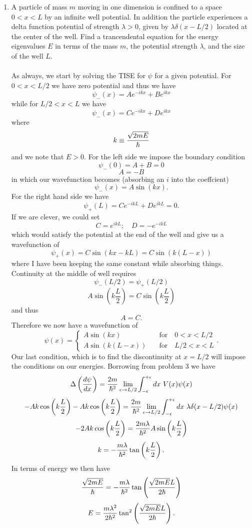 \documentclass[11pt,letterpaper]{article}
\begin{document}
\begin{enumerate}
\begin{enumerate}
\end{enumerate}
\item
A particle of mass $m$ moving in one dimension is confined to a space $0<x<L$ by an infinite well potential. In addition the particle experiences a delta function potential of strength $\lambda >0$, given by $\lambda\delta(x-L/2)$ located at the center of the well. Find a trancendental equation for the energy eigenvalues $E$ in terms of the mass $m$, the potential strength $\lambda$, and the size of the well $L$. 
\\ \\ As always, we start by solving the TISE for $\psi$ for a given potential. For $0<x<L/2$ we have zero potential and thus we have 
$$\psi_-(x) = Ae^{-ikx}+Be^{ikx}$$
while for $L/2<x<L$ we have
$$\psi_-(x) = Ce^{-ikx}+De^{ikx}$$
where 
$$k\equiv\frac{\sqrt{2mE}}{\hbar}$$
and we note that $E>0$.
For the left side we impose the boundary condition
$$\psi_-(0) = A+B=0$$
$$A=-B$$ in which our wavefunction becomes (absorbing an $i$ into the coeffcient)
$$\psi_-(x) = A\sin(kx).$$
For the right hand side we have
$$\psi_+(L) = Ce^{-ikL}+De^{ikL}=0.$$
If we are clever, we could set
$$C = e^{ikL};\quad D=-e^{-ikL}$$
which would satisfy the potential at the end of the well and give us a wavefunction of
$$\psi_+(x) = C\sin(kx-kL) = C\sin(k(L-x))$$
where I have been keeping the same constant while absorbing things. 
Continuity at the middle of well requires
$$\psi_-(L/2) = \psi_+(L/2)$$
$$A\sin(k\frac{L}{2}) = C\sin(k\frac{L}{2})$$
and thus 
$$A=C.$$
Therefore we now have a wavefunction of
$$\psi(x) = \begin{cases}A\sin(kx)&\quad\text{for}\quad 0<x<L/2\\A\sin(k(L-x))&\quad\text{for}\quad L/2<x<L\end{cases}.$$ 
Our last condition, which is to find the discontinuity at $x=L/2$ will impose the conditions on our energies. Borrowing from problem 3 we have
$$\Delta\left(\frac{d\psi}{dx}\right)= \frac{2m}{\h^2}\lim_{\epsilon\to L/2}\int_{-\epsilon}^{+\epsilon}{dx\ V(x)\psi(x)}
$$
$$-Ak\cos\left(k\frac{L}{2}\right)-Ak\cos\left(k\frac{L}{2}\right)= \frac{2m}{\h^2}\lim_{\epsilon\to L/2}\int_{-\epsilon}^{+\epsilon}{dx\ \lambda\delta(x-L/2)\psi(x)}$$
$$-2Ak\cos\left(k\frac{L}{2}\right)= \frac{2m\lambda}{\hbar^2}A\sin\left(k\frac{L}{2}\right)$$
$$k = -\frac{m\lambda}{\hbar^2}\tan\left(k\frac{L}{2}\right).$$
In terms of energy we then have
$$\frac{\sqrt{2mE}}{\hbar} = -\frac{m\lambda}{\hbar^2}\tan\left(\frac{\sqrt{2mE}L}{2\hbar}\right)$$
$$E = \frac{m\lambda^2}{2\hbar^2}\tan^2\left(\frac{\sqrt{2mE}L}{2\hbar}\right).$$


\end{enumerate}
\end{document}
